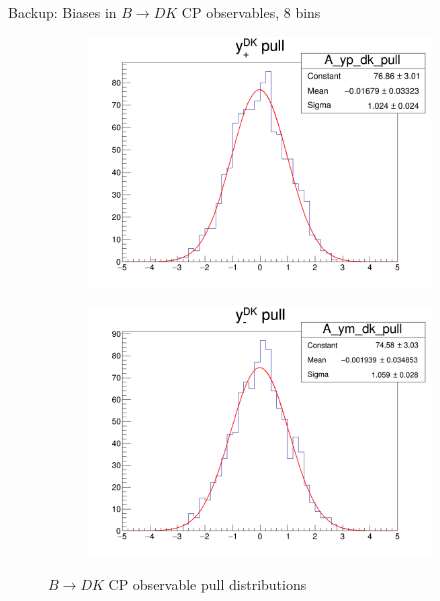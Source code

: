 \documentclass{beamer}
\begin{document}
\begin{frame}{Backup: Biases in $B\to DK$ CP observables, $8$ bins}
\begin{figure}
\begin{subfigure}{0.42\textwidth}
      \includegraphics[width = 1.0\textwidth]{A_yp_dk_8Bins_pull.png}
    \end{subfigure}%
    \begin{subfigure}{0.42\textwidth}
      \includegraphics[width = 1.0\textwidth]{A_ym_dk_8Bins_pull.png}
    \end{subfigure}
    \caption{$B\to DK$ CP observable pull distributions}
  \end{figure}
\end{frame}
\end{document}
